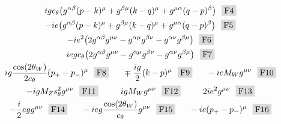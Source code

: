 \begin{gather*}
  ig\ct\big(g^{\alpha\beta}(p-k)^\mu+g^{\beta\mu}(k-q)^\mu
            +g^{\mu\alpha}(q-p)^\beta\big)~~\F4 \\
  -ie\big(g^{\alpha\beta}(p-k)^\mu+g^{\beta\mu}(k-q)^\mu
          +g^{\mu\alpha}(q-p)^\beta\big)~~\F5 \\
  -ie^2\big(2g^{\alpha\beta}g^{\mu\nu}-g^{\alpha\mu}g^{\beta\nu}
            -g^{\alpha\nu}g^{\beta\mu}\big)~~\F6 \\
  ieg\ct\big(2g^{\alpha\beta}g^{\mu\nu}-g^{\alpha\mu}g^{\beta\nu}
            -g^{\alpha\nu}g^{\beta\mu}\big)~~\F7 \\
  ig\frac{\cos(2\theta_W)}{2\ct}(p_+-p_-)^\mu~~\F8~~~~~
  \mp\frac{ig}{2}(k-p)^\mu~~\F9~~~~~
  -ieM_Wg^{\mu\nu}~~\F{10} \\
  -igM_Z \st^2 g^{\mu\nu}~~\F{11}~~~~~~~~
  igM_Wg^{\mu\nu}~~\F{12}~~~~~~~~
  2ie^2g^{\mu\nu}~~\F{13} \\
  -\frac{i}{2}egg^{\mu\nu}~~\F{14}~~~~~
  -ieg\frac{\cos(2\theta_W)}{\ct}g^{\mu\nu}~~\F{15}~~~~~
  -ie(p_+-p_-)^\mu~~\F{16}
\end{gather*}
